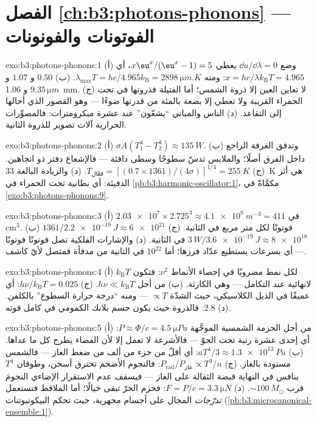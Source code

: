 \section*{الفصل \ref{ch:b3:photons-phonons} --- الفوتونات والفونونات}

\begin{solution}{exo:b3:photons-phonons:1}
(أ) وضع $\dd u/\dd\lambda = 0$ يعطي $x\eu^x/(\eu^x - 1) = 5$، أي
$x = hc/\lambda k_{\text{B}}T = 4.965$: ومنه $\lambda_{\max}T =
hc/4.965k_{\text{B}} = \qty{2898}{\micro m.K}$. (ب) $0.50$ و
$1.07$ و $9.35\,\unit{\micro m}$ و \qty{1.06}{mm}. (ج) لا تعاين العين إلا
ذروة الشمس؛ أما الفتيلة فذروتها في تحت الحمراء القريبة ولا تعطي إلا
بضعة بالمئة من قدرتها ضوءًا --- وهو القصور الذي
أحالها إلى التقاعد. (د) الناس والمباني ``يشعّون'' عند عشرة ميكرومترات:
فالمصوِّرات الحرارية آلات تصوير للذروة الثانية.
\end{solution}

\begin{solution}{exo:b3:photons-phonons:2}
(أ) $\sigma A(T_1^4 - T_2^4) \approx \qty{135}{W}$. (ب) وتدفق
الغرفة الراجع داخل الفرق أصلًا؛ والملابس تدسّ
سطوحًا وسطى دافئة --- فالإشعاع دفتر ذو اتجاهين. (ج)
$T_{\text{فعّال}} = [(0.7 \times 1361)/(4\sigma)]^{1/4} =
\qty{255}{K}$. (د) والزيادة البالغة \qty{33}{K} هي أثر الدفيئة:
أي بطانية تحت الحمراء في
\cref{pb:b3:harmonic-oscillator:1}، مكمَّاةً في
\cref{exo:b3:photons-phonons:9}.
\end{solution}

\begin{solution}{exo:b3:photons-phonons:3}
(أ) $\num{2.03e7} \times 2.725^3 \approx \qty{4.1e8}{m^{-3}} =
411$ في cm$^3$. (ب) $1361/\qty{2.2e-19}{J} \approx
\num{6e21}$ فوتونًا لكل متر مربع في الثانية. (ج) $3\,\unit{W}/
\qty{3.6e-19}{J} \approx \num{8e18}$ في الثانية. (د) والإشارات
الفلكية تصل فوتونًا فوتونًا --- أي بسرعات يستطيع عدّاد فرزها؛
أما $10^{22}$ في الثانية من مدفأة فمتصل لأيّ كاشف.
\end{solution}

\begin{solution}{exo:b3:photons-phonons:4}
(أ) $k_{\text{B}}T$ لكل نمط مضروبًا في إحصاء الأنماط $\nu^2$:
فتكون لانهائية عند التكامل --- وهي الكارثة. (ب) من أجل $h\nu \ll
k_{\text{B}}T$. (ج) $h\nu/k_{\text{B}}T = 0.025$: أي عميقًا في
الذيل الكلاسيكي، حيث الشدّة $\propto T$ --- ومنه
``درجة حرارة السطوع'' بالكلفن. (د) $2.8$: فالذروة حيث
يكون حسم بلانك الكمومي في كامل قوته.
\end{solution}

\begin{solution}{exo:b3:photons-phonons:5}
(أ) من أجل الحزمة الشمسية الموجَّهة $P \approx \Phi/c =
\qty{4.5}{\micro Pa}$: أي إحدى عشرة رتبة تحت الجوّ ---
فالأشرعة لا تعمل إلا لأن الفضاء يطرح كل ما عداها. (ب)
$aT^4/3 \approx \qty{1.3e13}{Pa}$: أي أقلّ من جزء من
ألف من ضغط الغاز --- فالشمس مسنودة بالغاز. (ج)
$P_{\text{rad}}/P_{\text{غاز}} \propto T^3/n$: فالنجوم الأضخم
تحترق أسخن، وطوفان $T^4$ ينافس في النهاية قبضة
الثقالة على الغاز --- فيسقف عدم الاستقرار الإضاءي النجومَ قرب
$\sim100\,M_\odot$. (د) $F = P/c = \qty{3.3}{\micro N}$:
فحزم الجرّ تبقى خيالًا؛ أما الملاقط فتستعمل \emph{تدرّجات} المجال
على أجسام مجهرية، حيث تحكم البيكونيوتنات
(\cref{pb:b3:microcanonical-ensemble:1}).
\end{solution}

